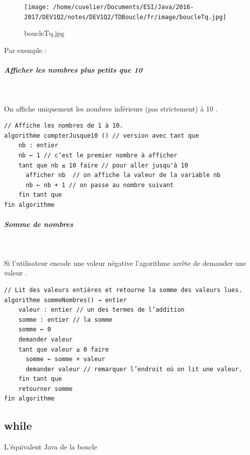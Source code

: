 \documentclass[11pt,a4paper]{article}
\begin{document}
            \par
        \begin{figure}[hbt]
				    \begin{center}
					\texttt{[image: /home/cuvelier/Documents/ESI/Java/2016-2017/DEV1Q2/notes/DEV1Q2/TDBoucle/fr/image/boucleTq.jpg]}
						\end{center}
                
                    \caption[boucleTq.jpg]{boucleTq.jpg}
                \end{figure}
                    
            \par
        Par exemple : 
            \par
        
			
		\subparagraph{Afficher les nombres plus petits que 10} 
		
					\textcolor{white}{.} \par
				On affiche uniquement les nombres inf\'erieurs (pas strictement) \`a 10 .
            \par
        \begin{verbatim}
// Affiche les nombres de 1 à 10.
algorithme compterJusque10 () // version avec tant que
    nb : entier
    nb ← 1 // c’est le premier nombre à afficher
    tant que nb ≤ 10 faire // pour aller jusqu'à 10
      afficher nb  // on affiche la valeur de la variable nb
      nb ← nb + 1 // on passe au nombre suivant
    fin tant que
fin algorithme
      \end{verbatim}
			
		\subparagraph{Somme de nombres} 
		
					\textcolor{white}{.} \par
				 Si l'utilisateur encode une valeur n\'egative l'agorithme arr\^ete de demander une valeur .
            \par
        \begin{verbatim}
// Lit des valeurs entières et retourne la somme des valeurs lues.
algorithme sommeNombres() → entier
    valeur : entier // un des termes de l’addition
    somme : entier // la somme
    somme ← 0
    demander valeur
    tant que valeur ≥ 0 faire
      somme ← somme + valeur
      demander valeur // remarquer l’endroit où on lit une valeur.
    fin tant que
    retourner somme
fin algorithme
      \end{verbatim}\subsection{while}
		    L'\'equivalent Java de la boucle 
		  
\end{document}
